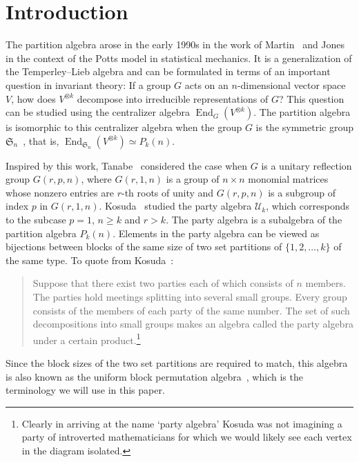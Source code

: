 \section{Introduction}
\label{Introduction}

The partition algebra arose in the early 1990s in the work of Martin~\cite{Martin.1991,Martin.1994, Martin.1996, Martin.2000} and Jones~\cite{Jones.1994}
in the context of the Potts model in statistical mechanics. It is a generalization of the Temperley--Lieb algebra and can be formulated
in terms of an important question in invariant theory: If a group $G$ acts on an $n$-dimensional vector space $V$, how does $V^{\otimes k}$
decompose into irreducible representations of $G$? This question can be studied using the centralizer algebra $\operatorname{End}_G(V^{\otimes k})$.
The partition algebra is isomorphic to this centralizer algebra when the group $G$ is the symmetric group $\mathfrak{S}_n$~\cite{Jones.1994,Martin.1994}, that is, $\operatorname{End}_{\mathfrak{S}_n}(V^{\otimes k}) \simeq P_k(n)$.

Inspired by this work, Tanabe~\cite{Tanabe.1997} considered the case when $G$ is a unitary reflection group $G(r,p,n)$, where $G(r,1,n)$ is a group
of $n \times n$ monomial matrices whose nonzero entries are $r$-th roots of unity and $G(r,p,n)$ is a subgroup of index $p$ in $G(r,1,n)$.
Kosuda~\cite{Kosuda.2000, Kosuda.2006} studied the party algebra $\mathcal{U}_k$, which corresponds to the subcase $p=1$, $n \geqslant k$
and $r>k$. The party algebra is a subalgebra of the partition algebra $P_k(n)$. Elements in the party algebra can be viewed as bijections between blocks
of the same size of two set partitions of $\{1,2,\ldots,k\}$ of the same type. To quote from Kosuda~\cite{Kosuda.2000}:
\begin{quote}
Suppose that there exist two parties each of which consists of $n$ members. The parties hold meetings splitting into several small groups.
Every group consists of the members of each party of the same number. The set of such decompositions into small groups makes an algebra
called the party algebra under a certain product.\footnote{Clearly in arriving at the name
`party algebra' Kosuda was not imagining a party of introverted mathematicians for
which we would likely see each vertex in the diagram isolated.}
\end{quote}
Since the block sizes of the two set  partitions are required to match, this algebra is also known as the uniform block permutation
algebra~\cite{FitzGerald.2003}, which is the terminology we will use in this paper.

